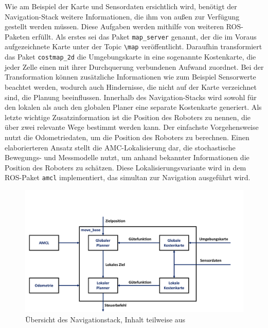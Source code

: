 Wie am Beispiel der Karte und Sensordaten ersichtlich wird, benötigt der Navigation-Stack weitere Informationen, die ihm von außen zur Verfügung gestellt werden müssen. Diese Aufgaben werden mithilfe von weiteren ROS-Paketen erfüllt. Als erstes sei das Paket \lstinline{map_server}{} genannt, der die im Voraus aufgezeichnete Karte unter der Topic \lstinline{\map}{} veröffentlicht. Daraufhin transformiert das Paket \lstinline{costmap_2d}{} die Umgebungskarte in eine sogenannte Kostenkarte, die jeder Zelle einen mit ihrer Durchquerung verbundenen Aufwand zuordnet. Bei der Transformation können zusätzliche Informationen wie zum Beispiel Sensorwerte beachtet werden, wodurch auch Hindernisse, die nicht auf der Karte verzeichnet sind, die Planung beeinflussen. Innerhalb des Navigation-Stacks wird sowohl für den lokalen als auch den globalen Planer eine separate Kostenkarte generiert.
Als letzte wichtige Zusatzinformation ist die Position des Roboters zu nennen, die über zwei relevante Wege bestimmt werden kann. Der einfachste Vorgehensweise nutzt die Odometriedaten, um die Position des Roboters zu berechnen. Einen elaborierteren Ansatz stellt die AMC-Lokalisierung dar, die stochastische Bewegungs- und Messmodelle nutzt, um anhand bekannter Informationen die Position des Roboters zu schätzen. Diese Lokalisierungsvariante wird in dem ROS-Paket \lstinline{amcl}{} implementiert, das simultan zur Navigation ausgeführt wird.
\begin{figure}[!ht]
\centering
\includegraphics[width=\linewidth,trim={0cm 0cm 2cm 4cm},clip]{img/Navigationstack.pdf}
\caption{Übersicht des Navigationstack, Inhalt teilweise aus \cite{WikiMoveBase}}
\end{figure}

